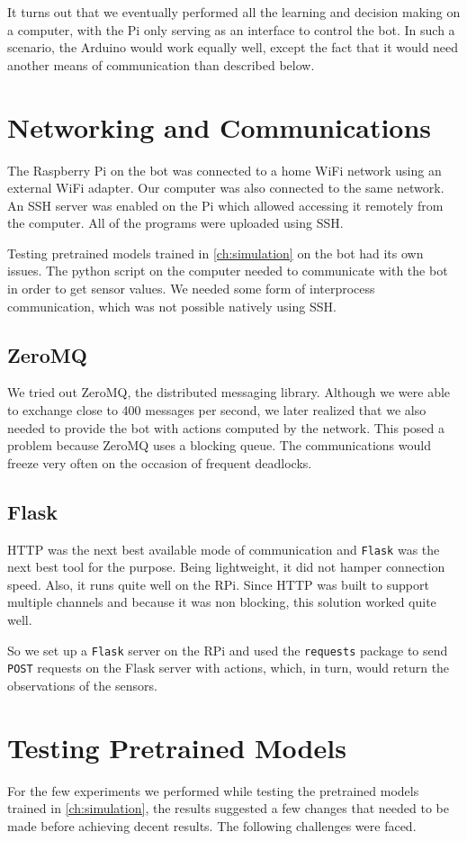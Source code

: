 \documentclass[12pt]{extreport}
\begin{document}
It turns out that we eventually performed all the learning and decision making on a computer, with the Pi only serving as an interface to control the bot. In such a scenario, the Arduino would work equally well, except the fact that it would need another means of communication than described below.

\section{Networking and Communications}
The Raspberry Pi on the bot was connected to a home WiFi network using an external WiFi adapter. Our computer was also connected to the same network.
An SSH server was enabled on the Pi which allowed accessing it remotely from the computer. All of the programs were uploaded using SSH.

Testing pretrained models trained in \autoref{ch:simulation} on the bot had its own issues. The python script on the computer needed to communicate with the bot in order to get sensor values. We needed some form of interprocess communication, which was not possible natively using SSH.

\subsection{ZeroMQ}
We tried out ZeroMQ, the distributed messaging library. Although we were able to exchange close to 400 messages per second, we later realized that we also needed to provide the bot with actions computed by the network. This posed a problem because ZeroMQ uses a blocking queue. The communications would freeze very often on the occasion of frequent deadlocks.

\subsection{Flask}
HTTP was the next best available mode of communication and \texttt{Flask} was the next best tool for the purpose. Being lightweight, it did not hamper connection speed. Also, it runs quite well on the RPi. Since HTTP was built to support multiple channels and because it was non blocking, this solution worked quite well.

So we set up a \texttt{Flask} server on the RPi and used the \texttt{requests} package to send \texttt{POST} requests on the Flask server with actions, which, in turn, would return the observations of the sensors.

\section{Testing Pretrained Models} \label{sec:testpretrainedmodels}
For the few experiments we performed while testing the pretrained models trained in \autoref{ch:simulation}, the results suggested a few changes that needed to be made before achieving decent results. The following challenges were faced.
\end{document}
